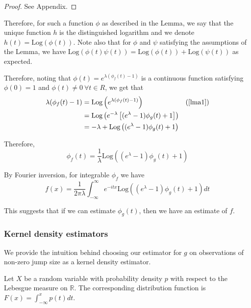 \documentclass[a4paper,11pt]{article}
\theoremstyle{theorem}
\theoremstyle{definition}
\theoremstyle{remark}
\begin{document}
\begin{proof}
See Appendix.
\end{proof}

Therefore, for such a function $\phi$ as described in the Lemma, we say that the unique function $h$ is the distinguished logarithm and we denote $h(t) = \text{Log}(\phi(t))$. Note also that for $\phi$ and $\psi$ satisfying the assumptions of the Lemma, we have $\text{Log}(\phi(t)\psi(t)) = \text{Log}(\phi(t)) + \text{Log}(\psi(t))$ as expected.  

Therefore, noting that $\phi(t) = e^{\lambda(\phi_{f}(t) - 1)}$ is a continuous function satisfying $\phi(0) = 1$ and $\phi(t) \neq 0 \ \forall t \in R$, we get that
\begin{align*}
\lambda(\phi_{f}(t) - 1) &= \text{Log}\left(e^{\lambda (\phi_{f}(t) - 1)}\right)& \text{(\cref{lma1})} \\
                         &= \text{Log}\left(e^{-\lambda}\left[(e^{\lambda} - 1)\phi_{g}(t) + 1\right] \right) \\
                         &= -\lambda + \text{Log}\left((e^{\lambda} - 1)\phi_{g}(t) + 1\right)
\end{align*}

Therefore,
\begin{equation} \label{eq:charf}
\phi_{f}(t) = \frac{1}{\lambda}\text{Log}\left((e^{\lambda} - 1)\phi_{g}(t) + 1\right)
\end{equation} 

By Fourier inversion, for integrable $\phi_{f}$ we have
\begin{equation} \label{eq:fourier}
f(x) = \frac{1}{2\pi\lambda}\int_{-\infty}^{\infty}{e^{-itx}\text{Log}\left((e^{\lambda} - 1)\phi_{g}(t) + 1\right)}dt
\end{equation}

This suggests that if we can estimate $\phi_{g}(t)$, then we have an estimate of $f$.

\subsubsection{Kernel density estimators}

We provide the intuition behind choosing our estimator for $g$ on observations of non-zero jump size as a kernel density estimator.

Let $X$ be a random variable with probability density $p$ with respect to the Lebesgue measure on $\mathbb{R}$. The corresponding distribution function is $F(x) = \int_{-\infty}^{x}{p(t)}dt$.
\end{document}
